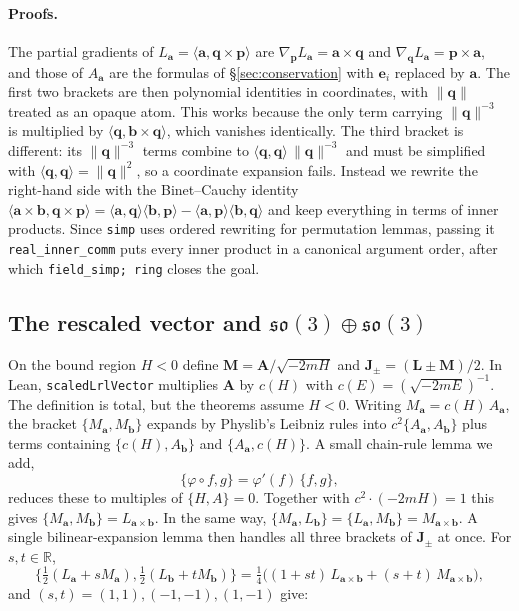\documentclass[11pt]{article}
\theoremstyle{definition}
\theoremstyle{remark}
\newcommand{\vA}{\mathbf{A}}
\newcommand{\vL}{\mathbf{L}}
\newcommand{\vp}{\mathbf{p}}
\newcommand{\vq}{\mathbf{q}}
\newcommand{\vM}{\mathbf{M}}
\newcommand{\vJ}{\mathbf{J}}
\newcommand{\ip}[2]{\langle #1, #2\rangle}
\begin{document}
\paragraph{Proofs.} The partial gradients of $L_{\mathbf a}=\ip{\mathbf a}{\vq\times\vp}$ are
$\nabla_{\vp}L_{\mathbf a}=\mathbf a\times\vq$ and $\nabla_{\vq}L_{\mathbf a}=\vp\times\mathbf a$,
and those of $A_{\mathbf a}$ are the formulas of \S\ref{sec:conservation} with $\mathbf e_i$
replaced by $\mathbf a$. The first two brackets are then polynomial identities in coordinates,
with $\|\vq\|$ treated as an opaque atom. This works because the only term carrying
$\|\vq\|^{-3}$ is multiplied by $\ip{\vq}{\mathbf b\times\vq}$, which vanishes identically. The
third bracket is different: its $\|\vq\|^{-3}$ terms combine to
$\ip{\vq}{\vq}\,\|\vq\|^{-3}$ and must be simplified with $\ip{\vq}{\vq}=\|\vq\|^2$, so a
coordinate expansion fails. Instead we rewrite the right-hand side with the Binet--Cauchy identity
$\ip{\mathbf a\times\mathbf b}{\vq\times\vp}=\ip{\mathbf a}{\vq}\ip{\mathbf b}{\vp}-
\ip{\mathbf a}{\vp}\ip{\mathbf b}{\vq}$ and keep everything in terms of inner products. Since
\texttt{simp} uses ordered rewriting for permutation lemmas, passing it \texttt{real\_inner\_comm}
puts every inner product in a canonical argument order, after which \texttt{field\_simp; ring}
closes the goal.

\subsection{The rescaled vector and \texorpdfstring{$\mathfrak{so}(3)\oplus\mathfrak{so}(3)$}{so(3)+so(3)}}

On the bound region $H<0$ define $\vM=\vA/\sqrt{-2mH}$ and $\vJ_\pm=(\vL\pm\vM)/2$. In Lean,
\texttt{scaledLrlVector} multiplies $\vA$ by $c(H)$ with $c(E)=(\sqrt{-2mE})^{-1}$. The
definition is total, but the theorems assume $H<0$. Writing $M_{\mathbf a}=c(H)\,A_{\mathbf a}$,
the bracket $\{M_{\mathbf a},M_{\mathbf b}\}$ expands by Physlib's Leibniz rules into
$c^2\{A_{\mathbf a},A_{\mathbf b}\}$ plus terms containing $\{c(H),A_{\mathbf b}\}$ and
$\{A_{\mathbf a},c(H)\}$. A small chain-rule lemma we add,
\[
  \{\varphi\circ f,g\}=\varphi'(f)\,\{f,g\},
\]
reduces these to multiples of $\{H,A\}=0$. Together with $c^2\cdot(-2mH)=1$ this gives
$\{M_{\mathbf a},M_{\mathbf b}\}=L_{\mathbf a\times\mathbf b}$. In the same way,
$\{M_{\mathbf a},L_{\mathbf b}\}=\{L_{\mathbf a},M_{\mathbf b}\}=M_{\mathbf a\times\mathbf b}$.
A single bilinear-expansion lemma then handles all three brackets of $\vJ_\pm$ at once. For
$s,t\in\mathbb R$,
\[
  \Big\{\tfrac12(L_{\mathbf a}+sM_{\mathbf a}),\tfrac12(L_{\mathbf b}+tM_{\mathbf b})\Big\}
  =\tfrac14\big((1+st)\,L_{\mathbf a\times\mathbf b}+(s+t)\,M_{\mathbf a\times\mathbf b}\big),
\]
and $(s,t)=(1,1),(-1,-1),(1,-1)$ give:
\end{document}
